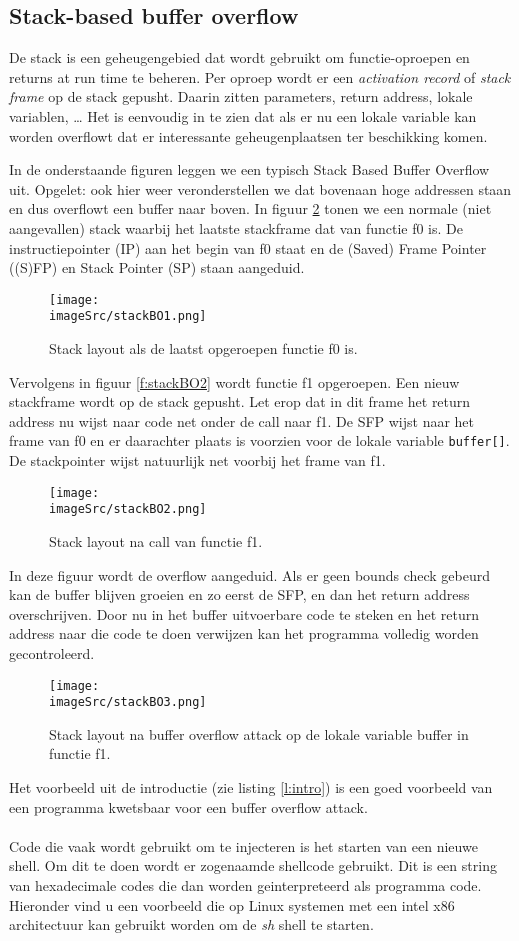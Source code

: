\documentclass[../main.tex]{subfiles}
\begin{document}
\subsection{Stack-based buffer overflow}
De stack is een geheugengebied dat wordt gebruikt om functie-oproepen en returns at run time te beheren.
Per oproep wordt er een \emph{activation record} of \emph{stack frame} op de stack gepusht. Daarin zitten parameters, return address, lokale variablen, \ldots
Het is eenvoudig in te zien dat als er nu een lokale variable kan worden overflowt dat er interessante geheugenplaatsen ter beschikking komen.

In de onderstaande figuren leggen we een typisch Stack Based Buffer Overflow uit. Opgelet: ook hier weer veronderstellen we dat bovenaan hoge addressen staan en dus overflowt een buffer naar boven.
In figuur \ref{f:stackBO1} tonen we een normale (niet aangevallen) stack waarbij het laatste stackframe dat van functie f0 is. De instructiepointer (IP) aan het begin van f0 staat en de (Saved) Frame Pointer ((S)FP) en Stack Pointer (SP) staan aangeduid.
\begin{figure}
\centering
\texttt{[image: \\imageSrc/stackBO1.png]}
\caption{Stack layout als de laatst opgeroepen functie f0 is.}
\label{f:stackBO1}
\end{figure}

Vervolgens in figuur \ref{f:stackBO2} wordt functie f1 opgeroepen. Een nieuw stackframe wordt op de stack gepusht. Let erop dat in dit frame het return address nu wijst naar code net onder de call naar f1. De SFP wijst naar het frame van f0 en er daarachter plaats is voorzien voor de lokale variable \lstinline[style=ilcstyle]{buffer[]}. De stackpointer wijst natuurlijk net voorbij het frame van f1.
\begin{figure}
\centering
\texttt{[image: \\imageSrc/stackBO2.png]}
\caption{Stack layout na call van functie f1.}
\label{f:stackBO1}
\end{figure}

In deze figuur wordt de overflow aangeduid. Als er geen bounds check gebeurd kan de buffer blijven groeien en zo eerst de SFP, en dan het return address overschrijven. Door nu in het buffer uitvoerbare code te steken en het return address naar die code te doen verwijzen kan het programma volledig worden gecontroleerd.
\begin{figure}
\centering
\texttt{[image: \\imageSrc/stackBO3.png]}
\caption{Stack layout na buffer overflow attack op de lokale variable buffer in functie f1.}
\label{f:stackBO3}
\end{figure}
Het voorbeeld uit de introductie (zie listing \ref{l:intro}) is een goed voorbeeld van een programma kwetsbaar voor een buffer overflow attack.
\\\\
Code die vaak wordt gebruikt om te injecteren is het starten van een nieuwe shell.
Om dit te doen wordt er zogenaamde shellcode gebruikt.
Dit is een string van hexadecimale codes die dan worden geinterpreteerd als programma code.
Hieronder vind u een voorbeeld die op Linux systemen met een intel x86 architectuur kan gebruikt worden om de \emph{sh} shell te starten.
\end{document}

